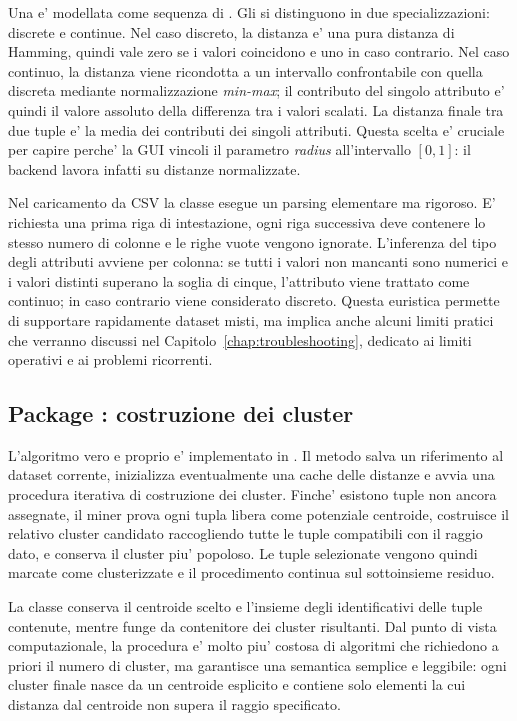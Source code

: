 Una  e' modellata come sequenza di . Gli  si
distinguono in due specializzazioni: discrete e continue. Nel caso discreto, la distanza
e' una pura distanza di Hamming, quindi vale zero se i valori coincidono e uno in caso
contrario. Nel caso continuo, la distanza viene ricondotta a un intervallo confrontabile
con quella discreta mediante normalizzazione \emph{min-max}; il contributo del singolo
attributo e' quindi il valore assoluto della differenza tra i valori scalati. La distanza
finale tra due tuple e' la media dei contributi dei singoli attributi. Questa scelta e'
cruciale per capire perche' la GUI vincoli il parametro \emph{radius} all'intervallo
$[0,1]$: il backend lavora infatti su distanze normalizzate.

Nel caricamento da CSV la classe  esegue un parsing elementare ma rigoroso.
E' richiesta una prima riga di intestazione, ogni riga successiva deve contenere lo
stesso numero di colonne e le righe vuote vengono ignorate. L'inferenza del tipo degli
attributi avviene per colonna: se tutti i valori non mancanti sono numerici e i valori
distinti superano la soglia di cinque, l'attributo viene trattato come continuo; in caso
contrario viene considerato discreto. Questa euristica permette di supportare rapidamente
dataset misti, ma implica anche alcuni limiti pratici che verranno discussi nel
Capitolo~\ref{chap:troubleshooting}, dedicato ai limiti operativi e ai problemi ricorrenti.

\subsection{Package : costruzione dei cluster}

L'algoritmo vero e proprio e' implementato in . Il metodo
 salva un riferimento al dataset corrente, inizializza
eventualmente una cache delle distanze e avvia una procedura iterativa di costruzione dei
cluster. Finche' esistono tuple non ancora assegnate, il miner prova ogni tupla libera
come potenziale centroide, costruisce il relativo cluster candidato raccogliendo tutte le
tuple compatibili con il raggio dato, e conserva il cluster piu' popoloso. Le tuple
selezionate vengono quindi marcate come clusterizzate e il procedimento continua sul
sottoinsieme residuo.

La classe  conserva il centroide scelto e l'insieme degli identificativi
delle tuple contenute, mentre  funge da contenitore dei cluster
risultanti. Dal punto di vista computazionale, la procedura e' molto piu' costosa di
algoritmi che richiedono a priori il numero di cluster, ma garantisce una semantica
semplice e leggibile: ogni cluster finale nasce da un centroide esplicito e contiene solo
elementi la cui distanza dal centroide non supera il raggio specificato.

